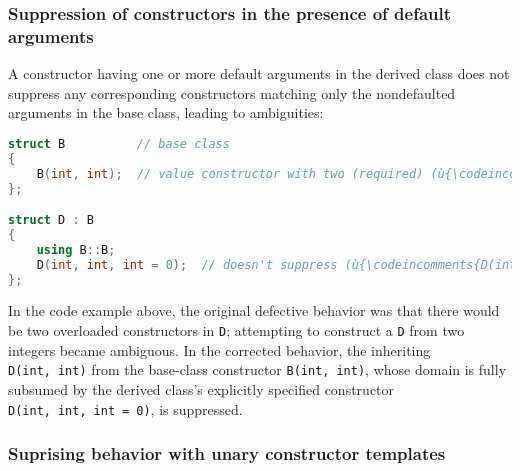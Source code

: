 \subsubsection[Suppression of constructors in the presence of default arguments]{Suppression of constructors in the presence of default arguments}

A constructor having one or more default arguments in the derived class does not suppress any corresponding constructors matching only the nondefaulted arguments in the base class, leading to ambiguities:
\begin{lstlisting}[language=C++]
struct B          // base class
{
    B(int, int);  // value constructor with two (required) (ù{\codeincomments{int}}ù) parameters
};

struct D : B
{
    using B::B;
    D(int, int, int = 0);  // doesn't suppress (ù{\codeincomments{D(int, int)}}ù) from (ù{\codeincomments{B(int, int)}}ù)
};
\end{lstlisting}
    In the code example above, the original defective behavior was that there would be two overloaded constructors in \texttt{D}; attempting to construct a \texttt{D} from two integers became ambiguous. In the corrected behavior, the inheriting \texttt{D(int,}~\texttt{int)} from the base-class constructor \texttt{B(int,}~\texttt{int)}, whose domain is fully subsumed by the derived class’s explicitly specified constructor \texttt{D(int,}~\texttt{int,}~\texttt{int}~\texttt{=}~\texttt{0)}, is suppressed.
    
\subsubsection[Suprising behavior with unary constructor templates]{Suprising behavior with unary constructor templates}

